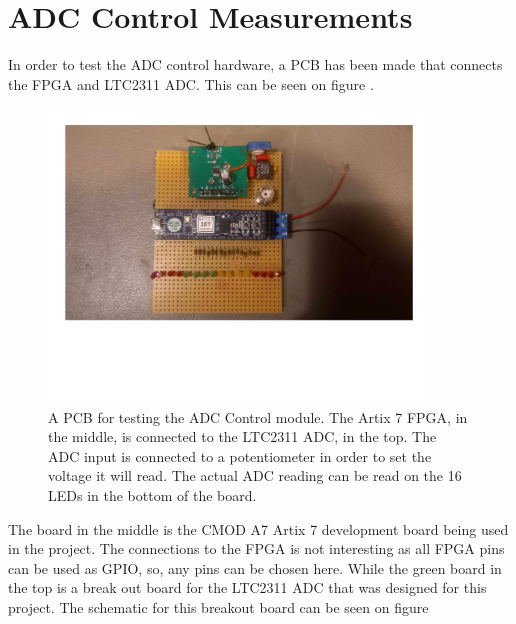 \chapter{ADC Control Measurements} \label{App:ADCControlMeasurement}
In order to test the ADC control hardware, a PCB has been made that connects the FPGA and LTC2311 ADC. This can be seen on figure .

\begin{figure}[H]
    \centering
    \includegraphics[clip, trim=0 100 0 0, width=0.9\textwidth]{Appendix/Figures/A_ADC_CONTROL_MEAS_ADC Control Tesr Setup.pdf}
    \caption{A PCB for testing the ADC Control module. The Artix 7 FPGA, in the middle, is connected to the LTC2311 ADC, in the top. The ADC input is connected to a potentiometer in order to set the voltage it will read. The actual ADC reading can be read on the 16 LEDs in the bottom of the board.}
    \label{fig:A_ADC_CONTROL_MEAS_SETUP}
\end{figure}

The board in the middle is the CMOD A7 Artix 7 development board being used in the project. The connections to the FPGA is not interesting as all FPGA pins can be used as GPIO, so, any pins can be chosen here. While the green board in the top is a break out board for the LTC2311 ADC that was designed for this project. The schematic for this breakout board can be seen on figure 

